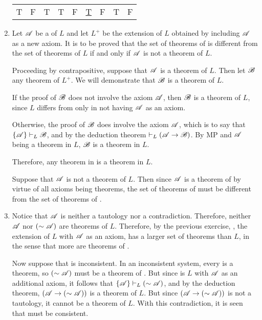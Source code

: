 \begin{enumerate}
\begin{center}
\begin{tabular}{ccccccccc}
        T& %
        F& %
        T& %
        T& %
        F& %
        \underline{T}& %
        F& %
        T& %
        F\\%
      \end{tabular}
    \end{center}

  \item %
    Let \(\mathscr{A}\) be a \wf{} of \(L\) and let \(L^+\) be the extension of \(L\) obtained by including \(\mathscr{A}\) as a new axiom. It is to be proved that the set of theorems of \Lp{} is different from the set of theorems of \(L\) if and only if \(\mathscr{A}\) is not a theorem of \(L\).

    \Ra{} Proceeding by contrapositive, suppose that \(\mathscr{A}\) is a theorem of \(L\). Then let \(\mathscr{B}\) any theorem of \(L^+\). We will demonstrate that \(\mathscr{B}\) is a theorem of \(L\).

    If the proof of \(\mathscr{B}\) does not involve the axiom \(\mathscr{A}\), then \(\mathscr{B}\) is a theorem of \(L\), since \(L\) differs from \Lp{} only in not having \(\mathscr{A}\) as an axiom.

    Otherwise, the proof of \(\mathscr{B}\) does involve the axiom \(\mathscr{A}\), which is to say that \(\{\mathscr{A}\} \vdash_{L} \mathscr{B}\), and by the deduction theorem \(\vdash_{L} (\mathscr{A} \rightarrow \mathscr{B})\). By MP and \(\mathscr{A}\) being a theorem in \(L\), \(\mathscr{B}\) is a theorem in \(L\).

    Therefore, any theorem in \Lp{} is a theorem in \(L\).

    \La{} Suppose that \(\mathscr{A}\) is not a theorem of \(L\). Then since \(\mathscr{A}\) is a theorem of \Lp{} by virtue of all axioms being theorems, the set of theorems of \Lp{} must be different from the set of theorems of \Lp{}.

  \item %
    Notice that \(\mathscr{A}\) is neither a tautology nor a contradiction. Therefore, neither \(\mathscr{A}\) nor \((\sim\mathscr{A})\) are theorems of \(L\). Therefore, by the previous exercise, \Lp{}, the extension of \(L\) with \(\mathscr{A}\) as an axiom, has a larger set of theorems than \(L\), in the sense that more \wfs{} are theorems of \Lp{}.

    Now suppose that \Lp{} is inconsistent. In an inconsistent system, every \wf{} is a theorem, so \((\sim\mathscr{A})\) must be a theorem of \Lp. But since \Lp{} is \(L\) with \(\mathscr{A}\) as an additional axiom, it follows that \(\{\mathscr{A}\} \vdash_{L} (\sim\mathscr{A})\), and by the deduction theorem, \((\mathscr{A} \rightarrow (\sim\mathscr{A}))\) is a theorem of \(L\). But since \((\mathscr{A} \rightarrow (\sim\mathscr{A}))\) is not a tautology, it cannot be a theorem of \(L\). With this contradiction, it is seen that \Lp{} must be consistent.


\end{enumerate}
